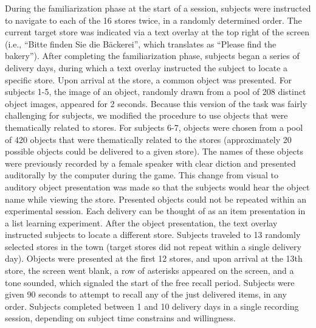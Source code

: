 During the familiarization phase at the  start of a session, subjects  were instructed to navigate to each of the 16 stores twice, in a randomly determined order. The current target store was indicated via a text overlay at the top right of the screen (i.e., ``Bitte finden Sie die B\"{a}ckerei'', which translates as ``Please find the bakery''). After completing the familiarization phase, subjects began a series of delivery days, during which a text overlay instructed the subject to locate a specific store. Upon arrival at the store, a common object was presented.  For subjects 1-5, the image of an object, randomly drawn from a pool of 208 distinct object images, appeared for 2 seconds. Because this version of the task was fairly challenging for subjects, we modified the procedure to use objects that were thematically related to stores.  For subjects 6-7, objects were  chosen from a pool of 420 objects that were thematically related to the stores (approximately 20 possible objects could be delivered to a given store). The names of these objects were previously recorded by a female speaker with clear diction and presented auditorally by the computer during the game.  This change from visual to auditory object presentation was made so that the subjects would hear the object name while viewing the store.  Presented objects could not be repeated within an experimental session. Each delivery can be thought of as an item presentation in a list learning experiment.  After the object presentation, the text overlay instructed subjects to locate a different store. Subjects traveled to 13 randomly selected stores in the town (target stores did not repeat within a single delivery day).  Objects were presented at the first 12 stores, and upon arrival at the 13th store, the screen went blank, a row of asterisks appeared on the screen, and a tone sounded, which signaled the start of the free recall period.  Subjects were given 90 seconds to attempt to recall any of the just delivered items, in any order.  Subjects completed between 1 and 10 delivery days in a single recording session, depending on subject time constrains and willingness.

